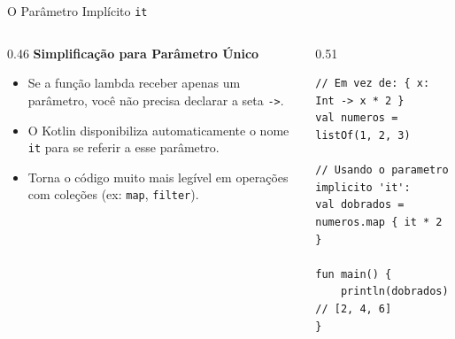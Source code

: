 \documentclass[aspectratio=169]{beamer}
\begin{document}
\begin{frame}[fragile]{O Parâmetro Implícito \texttt{it}}
  \begin{columns}[T]
    \begin{column}{0.46\textwidth}
      \textbf{Simplificação para Parâmetro Único}
      \vspace{0.3em}
      \begin{itemize}\small
        \item Se a função lambda receber apenas um parâmetro, você não precisa declarar a seta \texttt{->}.
        \item O Kotlin disponibiliza automaticamente o nome \texttt{it} para se referir a esse parâmetro.
        \item Torna o código muito mais legível em operações com coleções (ex: \texttt{map}, \texttt{filter}).
      \end{itemize}
    \end{column}
    \begin{column}{0.51\textwidth}
\begin{lstlisting}[style=KotlinStyle]
// Em vez de: { x: Int -> x * 2 }
val numeros = listOf(1, 2, 3)

// Usando o parametro implicito 'it':
val dobrados = numeros.map { it * 2 }

fun main() {
    println(dobrados) // [2, 4, 6]
}
\end{lstlisting}
    \end{column}
  \end{columns}
\end{frame}
\end{document}

